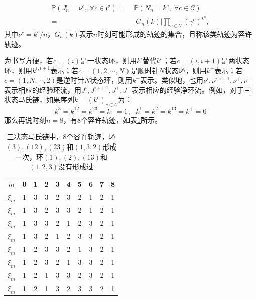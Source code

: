 \begin{equation}\label{joint}
    \begin{split}
    \mathbb{P}\left(J^c_n=\nu^c,\;\forall c\in\mathcal{C}\right)
    =&\;\mathbb{P}\left(N^c_n=k^c,\;\forall c\in\mathcal{C}\right)\\
    =&\;|G_n(k)|\prod_{c\in\mathcal{C}}\left(\gamma^c\right)^{k^c},
    \end{split}
\end{equation}
其中$\nu^c = k^c/n$，$G_n(k)$表示$n$时刻可能形成的轨迹的集合，且称该类轨迹为容许轨迹。

为书写方便，若$c=(i)$是一状态环，则用$k^i$替代$k^c$；若$c=(i,i+1)$是两状态环，则用$k^{i,i+1}$表示；若$c=(1,2,\cdots,N)$是顺时针$N$状态环，则用$k^{+}$表示；若$c=(1,N,\cdots,2)$是逆时针$N$状态环，则用$k^{-}$表示。类似地，也用$\nu^i, \nu^{i,i+1}, \nu^+, \nu^-$表示相应的经验环流，用$J^i, J^{i, i+1}, J^{+}, J^{-}$表示相应的经验净环流。例如，对于三状态马氏链，如果序列$k=(k^c)_{c\subset \mathcal{C}}$为：
\begin{equation} \label{trajectory_ex}
    k^3 = k^{12} = k^{23} = k^- = 1, ~~~ k^1 = k^2 = k^{13} = k^+= 0
\end{equation}
那么再说时刻$n=8$，有8个容许轨迹，如表\ref{table:all possible trajectories}所示。

\begin{table}[htb!]
    \renewcommand\arraystretch{1.2}
    \begin{tabular}{cccccccccc}
    \hline
   $m$   & 0 & 1 & 2 & 3 & 4 & 5 & 6 & 7 & 8 \\\hline
   $\xi_m$& 1 & 3 & 3 & 2 & 3 & 2 & 1 & 2 & 1 \\\hline
   $\xi_m$& 1 & 3 & 2 & 3 & 3 & 2 & 1 & 2 & 1 \\\hline
   $\xi_m$& 1 & 3 & 3 & 2 & 1 & 2 & 3 & 2 & 1 \\\hline
   $\xi_m$& 1 & 3 & 2 & 1 & 2 & 3 & 3 & 2 & 1 \\\hline
   $\xi_m$& 1 & 2 & 3 & 3 & 2 & 1 & 3 & 2 & 1 \\\hline
   $\xi_m$& 1 & 2 & 3 & 2 & 1 & 3 & 3 & 2 & 1 \\\hline
   $\xi_m$& 1 & 2 & 1 & 3 & 3 & 2 & 3 & 2 & 1 \\\hline
   $\xi_m$& 1 & 2 & 1 & 3 & 2 & 3 & 3 & 2 & 1 \\\hline
    \end{tabular}\centering
    \caption{三状态马氏链中，8个容许轨迹，环$(3), (12), (23)$和$(1,3,2)$形成一次，环$(1), (2), (13)$和$(1,2,3)$没有形成过}
    \label{table:all possible trajectories}
\end{table}

